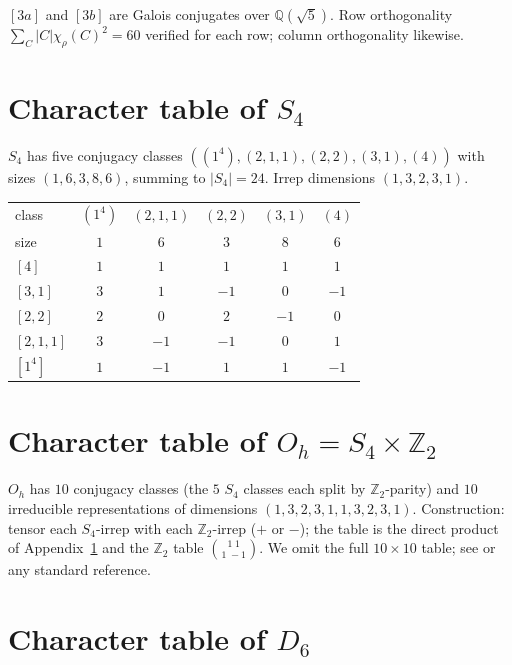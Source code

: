 \documentclass[12pt,a4paper]{article}
\theoremstyle{definition}
\theoremstyle{remark}
\newcommand{\bZ}{\mathbb{Z}}
\newcommand{\bQ}{\mathbb{Q}}                %
\begin{document}
\smallskip\noindent
$[3a]$ and $[3b]$ are Galois conjugates over $\bQ(\sqrt 5)$. Row
orthogonality $\sum_C |C| \chi_\rho(C)^2 = 60$ verified for each row;
column orthogonality likewise.

\section{Character table of $S_4$}\label{app:tables-S4}

$S_4$ has five conjugacy classes $((1^4), (2,1,1), (2,2), (3,1), (4))$
with sizes $(1, 6, 3, 8, 6)$, summing to $|S_4| = 24$. Irrep dimensions
$(1, 3, 2, 3, 1)$.

\smallskip
\begin{center}\small
\begin{tabular}{lccccc}
\toprule
class & $(1^4)$ & $(2,1,1)$ & $(2,2)$ & $(3,1)$ & $(4)$ \\
size & $1$ & $6$ & $3$ & $8$ & $6$ \\
\midrule
$[4]$    & $1$ & $1$  & $1$  & $1$  & $1$  \\
$[3,1]$  & $3$ & $1$  & $-1$ & $0$  & $-1$ \\
$[2,2]$  & $2$ & $0$  & $2$  & $-1$ & $0$  \\
$[2,1,1]$& $3$ & $-1$ & $-1$ & $0$  & $1$  \\
$[1^4]$  & $1$ & $-1$ & $1$  & $1$  & $-1$ \\
\bottomrule
\end{tabular}
\end{center}

\section{Character table of $O_h = S_4 \times \bZ_2$}\label{app:tables-Oh}

$O_h$ has $10$ conjugacy classes (the $5$ $S_4$ classes each split by
$\bZ_2$-parity) and $10$ irreducible representations of dimensions
$(1, 3, 2, 3, 1, 1, 3, 2, 3, 1)$. Construction: tensor each $S_4$-irrep
with each $\bZ_2$-irrep ($+$ or $-$); the table is the direct product of
Appendix~\ref{app:tables-S4} and the $\bZ_2$ table $\binom{1\;1}{1\;-1}$.
We omit the full $10 \times 10$ table; see \cite{Serre77} or any standard
reference.

\section{Character table of $D_6$}\label{app:tables-D6}
\end{document}
